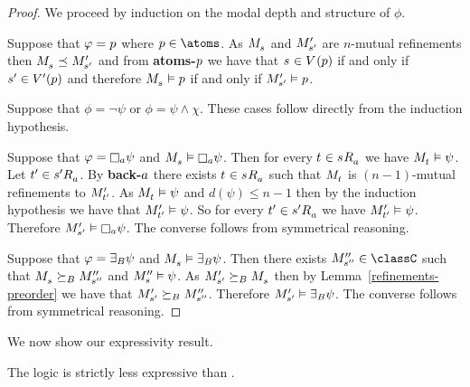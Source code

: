 \begin{proof}
We proceed by induction on the modal depth and structure of $\phi$.

Suppose that $\varphi = p$ where $\atomP \in \atoms$. 
As $\kPModel{\kStateS}$ and ${M^{\prime}_{{s}^{\prime}}}$ are $n$-mutual refinements then $\kPModel{\kStateS} \refines \kPModelP{\kStateSP}$ and from {\bf atoms-$p$} we have that $\kStateS \in \kValuation(\atomP)$ if and only if ${s}^{\prime} \in {V^{\prime}}(p)$ and therefore $\kPModel{\kStateS} \entails \atomP$ if and only if ${M^{\prime}_{{s}^{\prime}}} \vDash p$.

Suppose that $\phi = \neg \psi$ or $\phi = \psi \land \chi$.
These cases follow directly from the induction hypothesis.

Suppose that $\phi = \necessaryA \psi$ and $\kPModel{\kStateS} \entails \necessaryA \psi$.
Then for every $\kStateT \in \kStateS \kAccessibility{\agentA}$ we have $\kPModel{\kStateT} \entails \psi$.
Let $\kStateTP \in \kStateSP \kAccessibility{\agentA}$.
By {\bf back-$a$} there exists $\kStateT \in \kStateS \kAccessibility{\agentA}$ such that $\kPModel{\kStateT}$ is $(n-1)$-mutual refinements to ${M^{\prime}_{{t}^{\prime}}}$.
As $\kPModel{\kStateT} \entails \psi$ and $d(\psi) \leq n - 1$ then by the induction hypothesis we have that ${M^{\prime}_{{t}^{\prime}}} \vDash \psi$.
So for every $\kStateTP \in \kSuccessorsA{\kStateSP}$ we have ${M^{\prime}_{{t}^{\prime}}} \vDash \psi$.
Therefore $\kPModelP{\kStateSP} \entails \necessaryA \psi$.
The converse follows from symmetrical reasoning.

Suppose that $\varphi = {\exists_{B}} \psi$ and $\kPModel{\kStateS} \entails \somerefsBs \psi$.
Then there exists $\kPModelPP{\kStateSPP} \in \classC$ such that $\kPModel{\kStateS} \simulatesBs \kPModelPP{\kStateSPP}$ and $\kPModelPP{\kStateS} \entails \psi$.
As $\kPModelP{\kStateSP} \simulatesBs \kPModel{\kStateS}$ then by Lemma~\ref{refinements-preorder} we have that ${M^{\prime}_{{s}^{\prime}}} \succeq_{B} {M^{\prime\prime}_{{s}^{\prime\prime}}}$.
Therefore ${M^{\prime}_{{s}^{\prime}}} \vDash {\exists_{B}} \psi$.
The converse follows from symmetrical reasoning.
\end{proof}

We now show our expressivity result.

\begin{theorem}
The logic \logicRmlKF{} is strictly less expressive than \logicMuKF{}.
\end{theorem}

